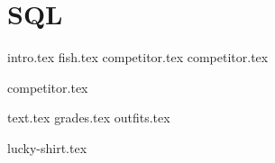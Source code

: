 \documentclass{exam}
\begin{document}
\section{SQL}
{intro.tex}
{fish.tex}
{competitor.tex}
{competitor.tex}

\begin{questions}
{competitor.tex}
\end{questions}
\newpage

{text.tex}
{grades.tex}
{outfits.tex}

\begin{questions}
{lucky-shirt.tex}
\end{questions}
\end{document}
